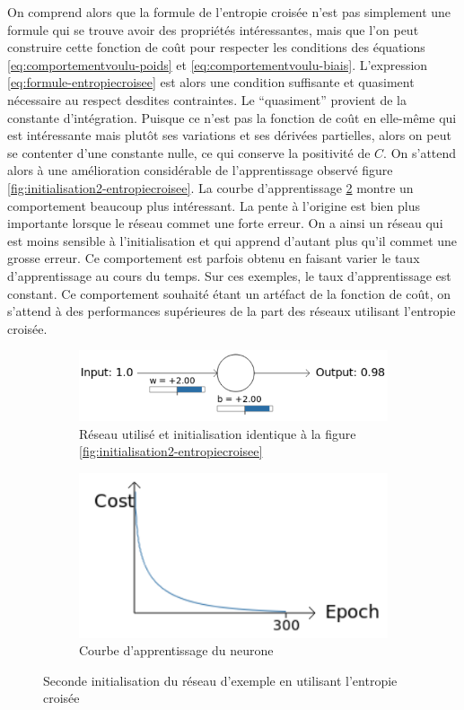 On comprend alors que la formule de l'entropie croisée n'est pas simplement une formule qui se trouve avoir des propriétés intéressantes, mais que l'on peut
construire cette fonction de coût pour respecter les conditions des équations \ref{eq:comportementvoulu-poids} et \ref{eq:comportementvoulu-biais}. 
L'expression \ref{eq:formule-entropiecroisee} est alors une condition suffisante et quasiment nécessaire au respect desdites contraintes. 
Le ``quasiment'' provient de la constante d'intégration. Puisque ce n'est pas la fonction de coût en elle-même qui est intéressante mais plutôt
ses variations et ses dérivées partielles, alors on peut se contenter d'une constante nulle, ce qui conserve la positivité de $C$. On s'attend alors
à une amélioration considérable de l'apprentissage observé figure \ref{fig:initialisation2-entropiecroisee}. La courbe d'apprentissage
\ref{fig:initialisation3-entropiecroisee-courbe} montre un comportement beaucoup plus intéressant. La pente à l'origine est bien plus importante
lorsque le réseau commet une forte erreur. On a ainsi un réseau qui est moins sensible à l'initialisation et qui apprend d'autant plus qu'il commet une
grosse erreur. Ce comportement est parfois obtenu en faisant varier le taux d'apprentissage au cours du temps. Sur ces exemples, le taux d'apprentissage
est constant. Ce comportement souhaité étant un artéfact de la fonction de coût, on s'attend à des performances supérieures de la part des réseaux
utilisant l'entropie croisée.

\begin{figure}[h]
\centering
\begin{subfigure}{.5\textwidth}
  \centering
  \includegraphics[width=.6\linewidth]{img/entropiecroisee_reseau_utilise_init2.png}
  \caption{Réseau utilisé et initialisation identique à la figure \ref{fig:initialisation2-entropiecroisee}}
  \label{fig:initialisation3-entropiecroisee-schema}
\end{subfigure}%
\begin{subfigure}{.4\textwidth}
  \centering
  \includegraphics[width=.4\linewidth]{img/entropiecroisee_apprentissage3.png}
  \caption{Courbe d'apprentissage du neurone}
  \label{fig:initialisation3-entropiecroisee-courbe}
\end{subfigure}
\caption{Seconde initialisation du réseau d'exemple en utilisant l'entropie croisée}
\label{fig:initialisation3-entropiecroisee}
\end{figure}

